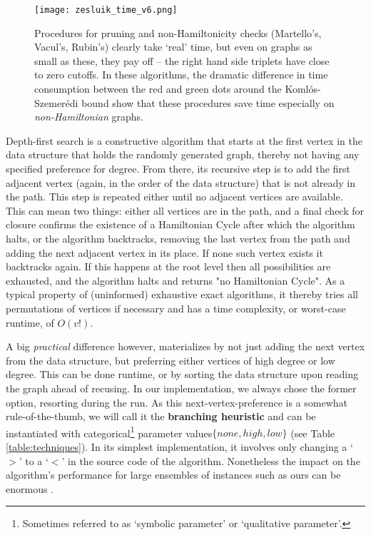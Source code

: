 \documentclass[10pt,conference,compsocconf]{IEEEtran}
\begin{document}
\begin{figure*}[h]
    \centering
    \texttt{[image: zesluik\_time\_v6.png]}
    \caption{Procedures for pruning and non-Hamiltonicity checks (Martello's, Vacul's, Rubin's) clearly take `real' time, but even on graphs as small as these, they pay off -- the right hand side triplets have close to zero cutoffs. In these algorithms, the dramatic difference in time consumption between the red and green dots around the Koml\'os-Szemer\'edi bound show that these procedures save time especially on \textit{non-Hamiltonian} graphs.}
    \label{fig:zesluik_time}
\end{figure*}


Depth-first search is a constructive algorithm that starts at the first vertex in the data structure that holds the randomly generated graph, thereby not having any specified preference for degree. From there, its recursive step is to add the first adjacent vertex (again, in the order of the data structure) that is not already in the path. This step is repeated either until no adjacent vertices are available. This can mean two things: either all vertices are in the path, and a final check for closure confirms the existence of a Hamiltonian Cycle after which the algorithm halts, or the algorithm backtracks, removing the last vertex from the path and adding the next adjacent vertex in its place. If none such vertex exists it backtracks again. If this happens at the root level then all possibilities are exhausted, and the algorithm halts and returns "no Hamiltonian Cycle". As a typical property of (uninformed) exhaustive exact algorithms, it thereby tries all permutations of vertices if necessary and has a time complexity, or worst-case runtime, of $O(v!)$. 

A big \textit{practical} difference however, materializes by not just adding the next vertex from the data structure, but preferring either vertices of high degree or low degree. This can be done runtime, or by sorting the data structure upon reading the graph ahead of recusing. In our implementation, we always chose the former option, resorting during the run. As this next-vertex-preference is a somewhat rule-of-the-thumb, we will call it the \textbf{branching heuristic} and can be instantiated with categorical\footnote{Sometimes referred to as `symbolic parameter' or `qualitative parameter'.} parameter values$\{none, high, low\}$ (see Table \ref{table:techniques}). In its simplest implementation, it involves only changing a `$>$' to a `$<$' in the source code of the algorithm. Nonetheless the impact on the algorithm's performance for large ensembles of instances such as ours can be enormous \cite{van2018predictive}.
\end{document}
